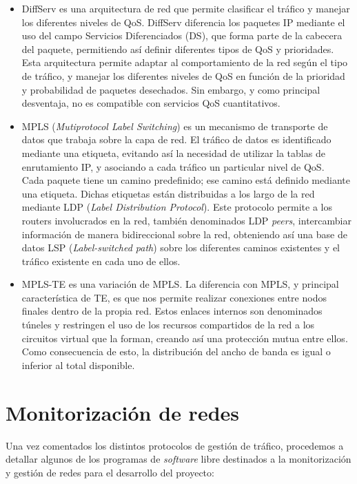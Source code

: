 	\begin{itemize}
		\item DiffServ es una arquitectura de red que permite clasificar el tráfico y manejar los diferentes niveles de QoS. DiffServ diferencia los paquetes IP mediante el uso del campo Servicios Diferenciados (DS), que forma parte de la cabecera del paquete, permitiendo así definir diferentes tipos de QoS y prioridades.\\
		Esta arquitectura permite adaptar al comportamiento de la red según el tipo de tráfico, y manejar los diferentes niveles de QoS en función de la prioridad y probabilidad de paquetes desechados. Sin embargo, y como principal desventaja, no es compatible con servicios QoS cuantitativos. 
		
		\item MPLS (\textit{Mutiprotocol Label Switching}) es un mecanismo de transporte de datos que trabaja sobre la capa de red. El tráfico de datos es identificado mediante una etiqueta, evitando así la necesidad de utilizar la tablas de enrutamiento IP, y asociando a cada tráfico un particular nivel de QoS.\\
		Cada paquete tiene un camino predefinido; ese camino está definido mediante una etiqueta. Dichas etiquetas están distribuidas a los largo de la red mediante LDP (\textit{Label Distribution Protocol}). Este protocolo permite a los routers involucrados en la red, también denominados LDP \textit{peers}, intercambiar información de manera bidireccional sobre la red,  obteniendo así una base de datos LSP (\textit{Label-switched path}) sobre los diferentes caminos existentes y el tráfico existente en cada uno de ellos.
		 
		\item MPLS-TE es una variación de MPLS. La diferencia con MPLS, y principal característica de TE, es que nos permite realizar conexiones entre nodos finales dentro de la propia red. Estos enlaces internos son denominados túneles y restringen el uso de los recursos compartidos de la red a los circuitos virtual que la forman, creando así una protección mutua entre ellos. Como consecuencia de esto, la distribución del ancho de banda es igual o inferior al total disponible. 
	\end{itemize}
	
	\section{Monitorización de redes}
	Una vez comentados los distintos protocolos de gestión de tráfico, procedemos a detallar algunos de los programas de \textit{software} libre destinados a la monitorización y gestión de redes para el desarrollo del proyecto:
	  
